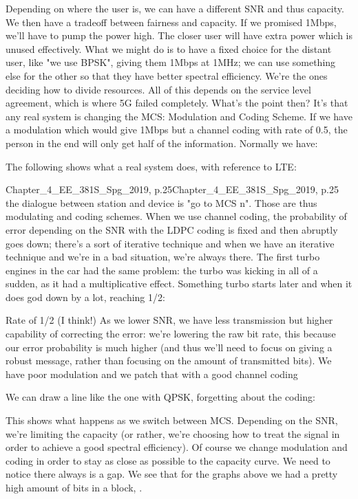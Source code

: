 {{{{{Depending on where the user is, we can have a different SNR and thus capacity. We then have a tradeoff between fairness and capacity. If we promised 1Mbps, we'll have to pump the power high. The closer user will have extra power which is unused effectively.
What we might do is to have a fixed choice for the distant user, like "we use BPSK",
giving them 1Mbps at 1MHz; we can use something else for the other so that they have better spectral efficiency. We're the ones deciding how to divide resources.
All of this depends on the service level agreement, which is where 5G failed completely.
What's the point then? It's that any real system is changing the MCS: Modulation and Coding Scheme. If we have a modulation which would give 1Mbps but a channel coding with rate of 0.5, the person in the end will only get half of the information.
Normally we have:

The following shows what a real system does, with reference to LTE:

Chapter_4_EE_381S_Spg_2019,
p.25Chapter_4_EE_381S_Spg_2019, p.25 the dialogue between station and device is "go to MCS n". Those are thus modulating and coding schemes.
When we use channel coding, the probability of error depending on the SNR with the LDPC coding is fixed and then abruptly goes down; there's a sort of iterative technique and when we have an iterative technique and we're in a bad situation, we're always there.
The first turbo engines in the car had the same problem: the turbo was kicking in all of a sudden, as it had a multiplicative effect.
Something turbo starts later and when it does god down by a lot, reaching 1/2:

Rate of 1/2
(I think!)
As we lower SNR, we have less transmission but higher capability of correcting the error: we're lowering the raw bit rate, this because our error probability is much higher
(and thus we'll need to focus on giving a robust message, rather than focusing on the amount of transmitted bits).
We have poor modulation and we patch that with a good channel coding

We can draw a line like the one with QPSK, forgetting about the coding:

This shows what happens as we switch between MCS.
Depending on the SNR, we're limiting the capacity (or rather, we're choosing how to treat the signal in order to achieve a good spectral efficiency). Of course we change modulation and coding in order to stay as close as possible to the capacity curve.
We need to notice there always is a gap.
We see that for the graphs above we had a pretty high amount of bits in a block,
.

}}}}}
